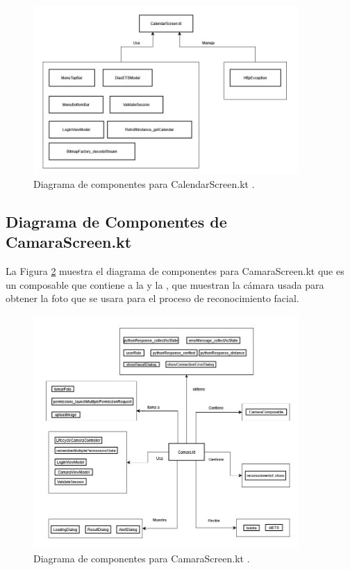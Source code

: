 \begin{figure}[htbp!]
	\begin{center}
		\includegraphics[width=0.9\textwidth]{DiagramasMoviles/DCM (13)}
		\caption{Diagrama de componentes para CalendarScreen.kt .}
		\label{fig:Componentes_1}
	\end{center}
\end{figure}

\newpage

\subsection{Diagrama de Componentes de CamaraScreen.kt}

La Figura \ref{fig:Componentes_2} muestra el diagrama de componentes para CamaraScreen.kt que es un composable que contiene a la  y la , que muestran la cámara usada para obtener la foto que se usara para el proceso de reconocimiento facial.

\begin{figure}[htbp!]
	\begin{center}
		\includegraphics[width=0.9\textwidth]{DiagramasMoviles/DCM (14)}
		\caption{Diagrama de componentes para CamaraScreen.kt .}
		\label{fig:Componentes_2}
	\end{center}
\end{figure}

